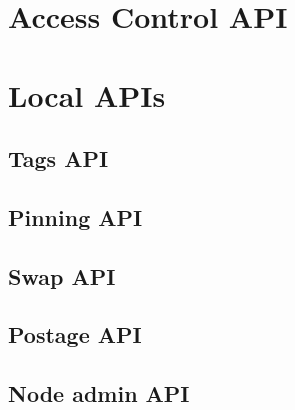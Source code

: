 \section{Access Control API}\label{spec:api:access-control}

\section{Local APIs}
\subsection{Tags API}\label{spec:api:tags}

\subsection{Pinning API}\label{spec:api:pinning}

\subsection{Swap API}\label{spec:api:swap}

\subsection{Postage API}\label{spec:api:postage}

\subsection{Node admin API}\label{spec:api:admin}


